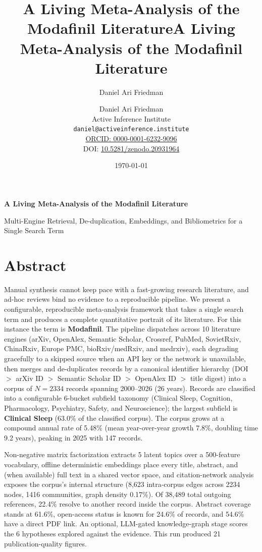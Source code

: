 \documentclass[
  english,
]{article}
\title{A Living Meta-Analysis of the Modafinil Literature}
\author{Daniel Ari Friedman}
\date{}
\title{A Living Meta-Analysis of the Modafinil Literature}
\author{Daniel Ari Friedman\\\footnotesize{Active Inference Institute}\\\footnotesize{\texttt{daniel@activeinference.institute}}\\\footnotesize{\href{https://orcid.org/0000-0001-6232-9096}{ORCID: 0000-0001-6232-9096}} \\ \footnotesize{DOI: \href{https://doi.org/10.5281/zenodo.20931964}{10.5281/zenodo.20931964}}}
\date{\today}
\begin{document}
\begin{titlepage}
\centering
\vspace*{2cm}
{\LARGE\bfseries A Living Meta-Analysis of the Modafinil Literature\par}
\vspace{0.75em}
{\large Multi-Engine Retrieval, De-duplication, Embeddings, and Bibliometrics for a Single Search Term\par}
\vfill
\makeatletter
{\@author\par}
\vspace{1em}
{\@date\par}
\makeatother
\vfill
\end{titlepage}
\thispagestyle{empty}
\tableofcontents
\newpage

\section{Abstract}\label{abstract}

Manual synthesis cannot keep pace with a fast-growing research
literature, and ad-hoc reviews bind no evidence to a reproducible
pipeline. We present a configurable, reproducible meta-analysis
framework that takes a single search term and produces a complete
quantitative portrait of its literature. For this instance the term is
\textbf{Modafinil}. The pipeline dispatches across 10 literature engines
(arXiv, OpenAlex, Semantic Scholar, Crossref, PubMed, SovietRxiv,
ChinaRxiv, Europe PMC, bioRxiv/medRxiv, and medrxiv), each degrading
gracefully to a skipped source when an API key or the network is
unavailable, then merges and de-duplicates records by a canonical
identifier hierarchy (DOI \(>\) arXiv ID \(>\) Semantic Scholar ID \(>\)
OpenAlex ID \(>\) title digest) into a corpus of \(N = 2334\) records
spanning 2000--2026 (26 years). Records are classified into a
configurable 6-bucket subfield taxonomy (Clinical Sleep, Cognition,
Pharmacology, Psychiatry, Safety, and Neuroscience); the largest
subfield is \textbf{Clinical Sleep} (63.0\% of the classified corpus).
The corpus grows at a compound annual rate of 5.48\% (mean
year-over-year growth 7.8\%, doubling time 9.2 years), peaking in 2025
with 147 records.

Non-negative matrix factorization extracts 5 latent topics over a
500-feature vocabulary, offline deterministic embeddings place every
title, abstract, and (when available) full text in a shared vector
space, and citation-network analysis exposes the corpus's internal
structure (8,623 intra-corpus edges across 2234 nodes, 1416 communities,
graph density 0.17\%). Of 38,489 total outgoing references, 22.4\%
resolve to another record inside the corpus. Abstract coverage stands at
61.6\%, open-access status is known for 24.6\% of records, and 54.6\%
have a direct PDF link. An optional, LLM-gated knowledge-graph stage
scores the 6 hypotheses explored against the evidence. This run produced
21 publication-quality figures.
\end{document}
